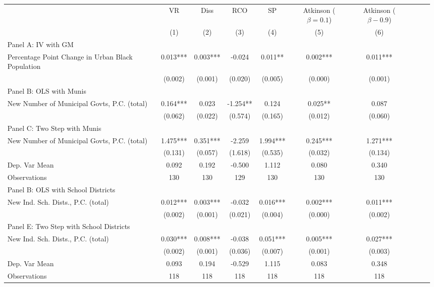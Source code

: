  \begin{tabular}{l*{9}{c}} \toprule
&\multicolumn{1}{c}{VR}&\multicolumn{1}{c}{Diss}&\multicolumn{1}{c}{RCO}&\multicolumn{1}{c}{SP}&\multicolumn{1}{c}{Atkinson ($\beta = 0.1$)}&\multicolumn{1}{c}{Atkinson ($\beta - 0.9$)}\\\cmidrule(lr){2-2}\cmidrule(lr){3-3}\cmidrule(lr){4-4}\cmidrule(lr){5-5}\cmidrule(lr){6-6}\cmidrule(lr){7-7}
&\multicolumn{1}{c}{(1)}&\multicolumn{1}{c}{(2)}&\multicolumn{1}{c}{(3)}&\multicolumn{1}{c}{(4)}&\multicolumn{1}{c}{(5)}&\multicolumn{1}{c}{(6)}\\
\cmidrule(lr){1-7}
\multicolumn{6}{l}{Panel A: IV with GM}\\
\cmidrule(lr){1-7}
Percentage Point Change in Urban Black Population&    0.013***&    0.003***&   -0.024   &    0.011** &    0.002***&    0.011***\\
                &  (0.002)   &  (0.001)   &  (0.020)   &  (0.005)   &  (0.000)   &  (0.001)   \\
\cmidrule(lr){1-7}
\multicolumn{6}{l}{Panel B: OLS with Munis}\\
\cmidrule(lr){1-7}
New Number of Municipal Govts, P.C. (total)&    0.164***&    0.023   &   -1.254** &    0.124   &    0.025** &    0.087   \\
                &  (0.062)   &  (0.022)   &  (0.574)   &  (0.165)   &  (0.012)   &  (0.060)   \\
\cmidrule(lr){1-7}
\multicolumn{6}{l}{Panel C: Two Step with Munis}\\
\cmidrule(lr){1-7}
New Number of Municipal Govts, P.C. (total)&    1.475***&    0.351***&   -2.259   &    1.994***&    0.245***&    1.271***\\
                &  (0.131)   &  (0.057)   &  (1.618)   &  (0.535)   &  (0.032)   &  (0.134)   \\
\midrule
Dep. Var Mean   &    0.092   &    0.192   &   -0.500   &    1.112   &    0.080   &    0.340   \\
Observations    &      130   &      130   &      129   &      130   &      130   &      130   \\
\cmidrule(lr){1-7}
\multicolumn{6}{l}{Panel B: OLS with School Districts}\\
\cmidrule(lr){1-7}
New Ind. Sch. Dists., P.C. (total)&    0.012***&    0.003***&   -0.032   &    0.016***&    0.002***&    0.011***\\
                &  (0.002)   &  (0.001)   &  (0.021)   &  (0.004)   &  (0.000)   &  (0.002)   \\
\cmidrule(lr){1-7}
\multicolumn{6}{l}{Panel E: Two Step with School Districts}\\
\cmidrule(lr){1-7}
New Ind. Sch. Dists., P.C. (total)&    0.030***&    0.008***&   -0.038   &    0.051***&    0.005***&    0.027***\\
                &  (0.002)   &  (0.001)   &  (0.036)   &  (0.007)   &  (0.001)   &  (0.003)   \\
\midrule
Dep. Var Mean   &    0.093   &    0.194   &   -0.529   &    1.115   &    0.083   &    0.348   \\
Observations    &      118   &      118   &      118   &      118   &      118   &      118   \\
       \bottomrule \end{tabular}
